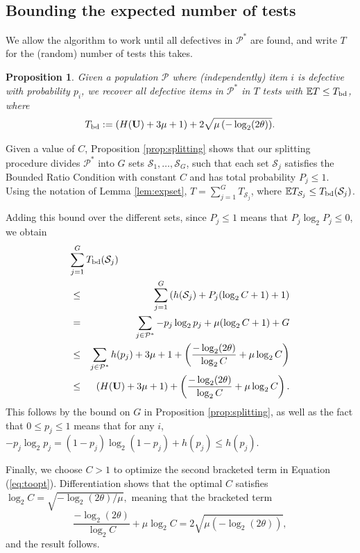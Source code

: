 \documentclass[conference]{IEEEtran}
\newcounter{eqn}
\newtheorem{proposition}[theorem]{Proposition}
\newcommand{\vc}[1]{{\mathbf{ #1}}}
\newcommand{\ep}{{\mathbb{E}}}
\newcommand{\setS}{{\mathcal{S}}}
\newcommand{\setP}{{\mathcal{P}}}
\newcommand{\bd}{{\rm bd}}
\begin{document}
\subsection{Bounding the expected number of tests} \label{sec:expectation}
%
We allow the algorithm to work until all defectives in $\setP^*$ are found, and write $T$ for the (random) number of tests this takes.
%
\begin{proposition} \label{prop:overall} Given a population $\setP$
where (independently) item $i$ is defective with probability $p_i$,  
we  recover  all defective items in $\setP^*$ in $T$ tests with $\ep T \leq T_{\bd}$, where
\begin{equation} \label{eq:tbd}
 T_{\bd} := \left( H( \vc{U}) + 3 \mu + 1 \right) +  
 2 \sqrt{ \mu  \left( -\log_2 (2\theta) \right)}.
\end{equation}
\end{proposition}
\begin{IEEEproof} Given a value of $C$,
Proposition \ref{prop:splitting} shows that our splitting procedure divides $\setP^*$ into 
$G$ sets $\setS_1, \ldots, \setS_G$, such that each set $\setS_j$ satisfies the Bounded Ratio Condition with constant $C$ and has total probability $P_j
\leq 1$. Using the notation of Lemma \ref{lem:expset}, $T = \sum_{j=1}^G T_{\setS_j}$, where 
$\ep T_{\setS_j} \leq  T_{\bd}(\setS_j)$.

Adding this bound over the different sets, since $P_j \leq 1$ means that $P_j \log_2 P_j \leq 0$, we obtain
\begin{eqnarray} \label{eq:total}
\lefteqn{ \sum_{j=1}^G T_{\bd}(\setS_j) } \nonumber \\
& \leq &  \sum_{j=1}^G \left(  h(\setS_j)  + P_j (\log_2 C+1) + 1 \right) \nonumber \\
& = & \sum_{j \in \setP^*} -p_j \log_2 p_j + \mu  (\log_2 C+1) + G \nonumber \\
& \leq & \sum_{j \in \setP^*} h(p_j)  + 3 \mu  +  1 + \left( \frac{ -\log_2 (2\theta)}{\log_2 C} +  \mu  \log_2 C \right)  
\nonumber \\
& \leq & \left( H( \vc{U}) + 3 \mu + 1 \right) +   \left( \frac{ -\log_2 (2 \theta)}{\log_2 C} +  \mu \log_2 C \right).
\label{eq:toopt}
\end{eqnarray}
This follows by the bound on $G$ in Proposition \ref{prop:splitting}, as well as 
the fact that $ 0 \leq p_j \leq 1$ means that 
 for any $i$, $ - p_j \log_2 p_j =  (1-p_j) \log_2 (1-p_j) + h(p_j) \leq h(p_j)$.

Finally, we  choose $C > 1$ to optimize the  second bracketed term in Equation (\ref{eq:toopt}).
Differentiation shows that the optimal $C$ satisfies $\log_2 C = \sqrt{ -\log_2 (2 \theta)/\mu},$ meaning that
 the 
bracketed term $$
\frac{ -\log_2 (2 \theta)}{\log_2 C} +  \mu \log_2 C  =
 2 \sqrt{ \mu  \left( -\log_2 (2\theta) \right)} ,$$
and the result follows.
\end{IEEEproof}
\end{document}
